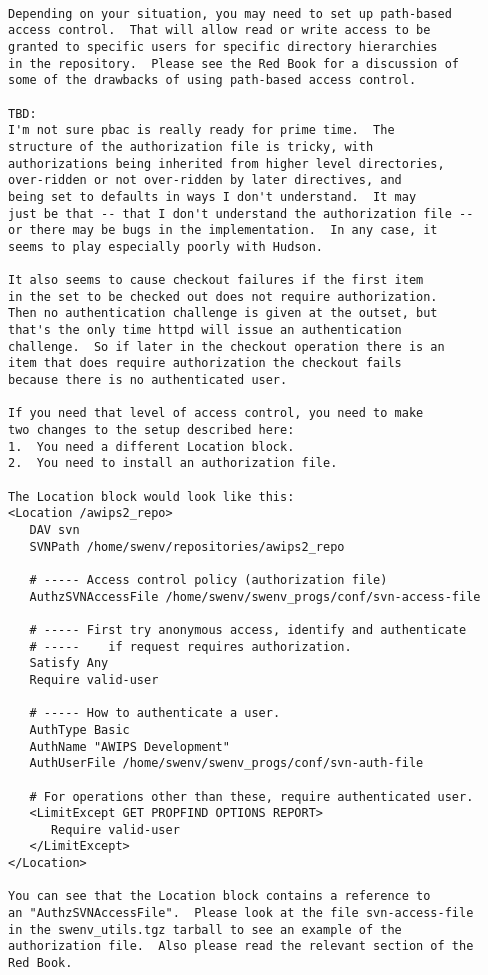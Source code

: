 \begin{verbatim}

Depending on your situation, you may need to set up path-based
access control.  That will allow read or write access to be
granted to specific users for specific directory hierarchies
in the repository.  Please see the Red Book for a discussion of
some of the drawbacks of using path-based access control.

TBD:
I'm not sure pbac is really ready for prime time.  The
structure of the authorization file is tricky, with
authorizations being inherited from higher level directories,
over-ridden or not over-ridden by later directives, and
being set to defaults in ways I don't understand.  It may
just be that -- that I don't understand the authorization file --
or there may be bugs in the implementation.  In any case, it
seems to play especially poorly with Hudson.  

It also seems to cause checkout failures if the first item
in the set to be checked out does not require authorization.
Then no authentication challenge is given at the outset, but
that's the only time httpd will issue an authentication
challenge.  So if later in the checkout operation there is an
item that does require authorization the checkout fails 
because there is no authenticated user.

If you need that level of access control, you need to make
two changes to the setup described here:
1.  You need a different Location block.
2.  You need to install an authorization file.

The Location block would look like this:
<Location /awips2_repo>
   DAV svn
   SVNPath /home/swenv/repositories/awips2_repo

   # ----- Access control policy (authorization file)
   AuthzSVNAccessFile /home/swenv/swenv_progs/conf/svn-access-file

   # ----- First try anonymous access, identify and authenticate
   # -----    if request requires authorization.
   Satisfy Any
   Require valid-user

   # ----- How to authenticate a user.
   AuthType Basic
   AuthName "AWIPS Development"
   AuthUserFile /home/swenv/swenv_progs/conf/svn-auth-file

   # For operations other than these, require authenticated user.
   <LimitExcept GET PROPFIND OPTIONS REPORT>
      Require valid-user
   </LimitExcept>
</Location>

You can see that the Location block contains a reference to 
an "AuthzSVNAccessFile".  Please look at the file svn-access-file
in the swenv_utils.tgz tarball to see an example of the 
authorization file.  Also please read the relevant section of the
Red Book.


\end{verbatim}

